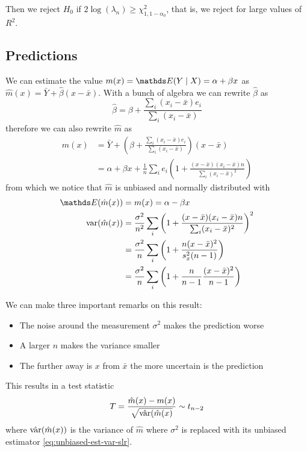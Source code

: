 \documentclass[12pt]{extarticle}
\begin{document}
Then we reject $H_0$ if $2\log(\lambda_n) \geq \chi^2_{1, 1-\alpha_0}$,
that is, we reject for large values of $R^2$.

\subsection{Predictions}

We can estimate the value $m(x) = \E(Y \mid X) = \alpha + \beta x$
as $\hat m(x) = \bar Y + \hat \beta (x - \bar x)$.
With a bunch of algebra we can rewrite $\hat \beta$ as
\begin{equation}
	\hat \beta = \beta +  \frac{\sum_i (x_i - \bar x) e_i}{\sum_i (x_i - \bar x)}
\end{equation}
therefore we can also rewrite $\hat m$ as
\begin{align}
	\hat m(x) & = \bar Y + \left(\beta +  \frac{\sum_i (x_i - \bar x) e_i}{\sum_i (x_i - \bar x)}\right) (x - \bar x)   \\
	          & = \alpha + \beta x + \frac{1}{n} \sum_i e_i(1+\frac{(x-\bar x)(x_i - \bar x) n}{\sum_i (x_i-\bar x)^2})
\end{align}
from which we notice that $\hat m$ is unbiased and normally distributed with
\begin{align}
	\E(\hat m(x))   & = m(x) = \alpha - \beta x                                                                                 \\
	\var(\hat m(x)) & = \frac{\sigma^2}{n^2} \sum_i \left( 1+ \frac{(x-\bar x)(x_i - \bar x) n}{\sum_i (x_i-\bar x)^2}\right)^2 \\
	                & = \frac{\sigma^2}{n} \sum_i \left( 1 + \frac{n(x-\bar x)^2}{s_x^2(n-1)}\right)                            \\
	                & = \frac{\sigma^2}{n} \sum_i \left( 1 + \frac{n}{n-1} \frac{(x-\bar x)^2}{n-1}\right)
\end{align}

We can make three important remarks on this result:
\begin{itemize}
	\item The noise around the measurement $\sigma^2$ makes the prediction worse
	\item A larger $n$ makes the variance smaller
	\item The further away is $x$ from $\bar x$ the more uncertain is the prediction
\end{itemize}

This results in a test statistic
\begin{equation}
	T = \frac{\hat m(x) - m(x)}{\sqrt{\hat{\var}(\hat m(x)}} \sim t_{n-2}
\end{equation}
where $\hat{\var}(\hat m(x))$ is the variance of $\hat m$ where $\sigma^2$ is replaced with its unbiased
estimator \cref{eq:unbiased-est-var-slr}.
\end{document}
